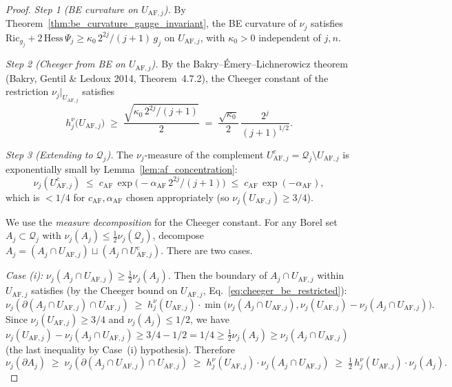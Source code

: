 \begin{proof}
\emph{Step 1 (BE curvature on $U_{\mathrm{AF},j}$).} By
Theorem~\ref{thm:be_curvature_gauge_invariant}, the BE curvature
of $\nu_{j}$ satisfies
$\mathrm{Ric}_{g_{j}}+2\,\mathrm{Hess}\,\Psi_{j}\ge
\kappa_{0}\,2^{2j}/(j+1)\,g_{j}$ on $U_{\mathrm{AF},j}$, with
$\kappa_{0}>0$ independent of $j,n$.

\emph{Step 2 (Cheeger from BE on $U_{\mathrm{AF},j}$).} By the
Bakry--\'Emery--Lichnerowicz theorem (Bakry, Gentil \& Ledoux
2014, Theorem~4.7.2), the Cheeger constant of the restriction
$\nu_{j}|_{U_{\mathrm{AF},j}}$ satisfies
\begin{equation}
\label{eq:cheeger_be_restricted}
  h_{j}^{\nu}\bigl(U_{\mathrm{AF},j}\bigr)
  \;\ge\;\frac{\sqrt{\kappa_{0}\,2^{2j}/(j+1)}}{2}
  \;=\;\frac{\sqrt{\kappa_{0}}}{2}\,\frac{2^{j}}{(j+1)^{1/2}}.
\end{equation}

\emph{Step 3 (Extending to $\mathcal{Q}_{j}$).} The
$\nu_{j}$-measure of the complement
$U_{\mathrm{AF},j}^{c}=\mathcal{Q}_{j}\setminus
U_{\mathrm{AF},j}$ is exponentially small by
Lemma~\ref{lem:af_concentration}:
\begin{equation}
\label{eq:complement_small}
  \nu_{j}(U_{\mathrm{AF},j}^{c})
  \;\le\;c_{\mathrm{AF}}\,\exp\!\bigl(-\alpha_{\mathrm{AF}}\,
  2^{2j}/(j+1)\bigr)
  \;\le\;c_{\mathrm{AF}}\,\exp(-\alpha_{\mathrm{AF}}),
\end{equation}
which is $<1/4$ for $c_{\mathrm{AF}},\alpha_{\mathrm{AF}}$
chosen appropriately (so $\nu_{j}(U_{\mathrm{AF},j})\ge 3/4$).

We use the \emph{measure decomposition} for the Cheeger
constant. For any Borel set
$A_{j}\subset\mathcal{Q}_{j}$ with
$\nu_{j}(A_{j})\le\tfrac{1}{2}\nu_{j}(\mathcal{Q}_{j})$,
decompose $A_{j}=(A_{j}\cap U_{\mathrm{AF},j})\sqcup
(A_{j}\cap U_{\mathrm{AF},j}^{c})$. There are two cases.

\emph{Case (i):}
$\nu_{j}(A_{j}\cap U_{\mathrm{AF},j})\ge\tfrac{1}{2}\nu_{j}(A_{j})$.
Then the boundary of $A_{j}\cap U_{\mathrm{AF},j}$ within
$U_{\mathrm{AF},j}$ satisfies (by the Cheeger bound on
$U_{\mathrm{AF},j}$, Eq.~\eqref{eq:cheeger_be_restricted}):
\begin{equation*}
  \nu_{j}(\partial(A_{j}\cap U_{\mathrm{AF},j})\cap U_{
  \mathrm{AF},j})
  \;\ge\;h_{j}^{\nu}(U_{\mathrm{AF},j})\cdot
  \min\bigl(\nu_{j}(A_{j}\cap U_{\mathrm{AF},j}),
  \nu_{j}(U_{\mathrm{AF},j})-\nu_{j}(A_{j}\cap U_{
  \mathrm{AF},j})\bigr).
\end{equation*}
Since $\nu_{j}(U_{\mathrm{AF},j})\ge 3/4$ and
$\nu_{j}(A_{j})\le 1/2$, we have
$\nu_{j}(U_{\mathrm{AF},j})-\nu_{j}(A_{j}\cap U_{
\mathrm{AF},j})\ge 3/4-1/2=1/4\ge\tfrac{1}{2}\nu_{j}(A_{j})
\ge\nu_{j}(A_{j}\cap U_{\mathrm{AF},j})$ (the last inequality
by Case~(i) hypothesis). Therefore
\begin{equation*}
  \nu_{j}(\partial A_{j})
  \;\ge\;\nu_{j}(\partial(A_{j}\cap U_{\mathrm{AF},j})\cap
  U_{\mathrm{AF},j})
  \;\ge\;h_{j}^{\nu}(U_{\mathrm{AF},j})\cdot
  \nu_{j}(A_{j}\cap U_{\mathrm{AF},j})
  \;\ge\;\tfrac{1}{2}\,h_{j}^{\nu}(U_{\mathrm{AF},j})\cdot
  \nu_{j}(A_{j}).
\end{equation*}


\end{proof}
